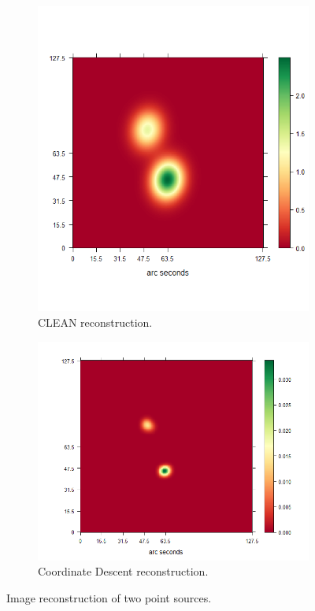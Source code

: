 \begin{figure}[h]
	\centering
	\begin{subfigure}[b]{0.4\linewidth}
		\includegraphics[width=\linewidth]{./chapters/20.results/points/tCLEAN.png}
		\caption{CLEAN reconstruction.}
		\label{results:points:tclean}
	\end{subfigure}
	\begin{subfigure}[b]{0.4\linewidth}
		\includegraphics[width=\linewidth]{./chapters/20.results/points/cd.png}
		\caption{Coordinate Descent reconstruction.}
		\label{results:points:cd}
	\end{subfigure}
	
	\caption{Image reconstruction of two point sources.}
	\label{results:point}
\end{figure}

